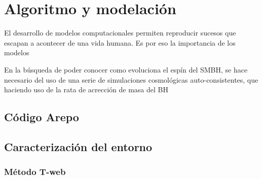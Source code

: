 \begin{savequote}[50mm]
\end{savequote}

\chapter{Algoritmo y modelación}
\label{cha:Modelo de Spin}
El desarrollo de modelos computacionales permiten reproducir sucesos que escapan a acontecer de una vida humana. Es por eso la importancia de los modelos

En la búsqueda de poder conocer como evoluciona el espín del SMBH, se hace necesario del uso de una serie de simulaciones cosmológicas auto-consistentes, que haciendo uso de la rata de acrección de masa del BH

\section{Código Arepo}
\label{sec: codigo arepo}


\section{Caracterización del entorno}
\label{sec: Caracterizacion entorno}

    \subsection{Método T-web}
    \label{subsec: Metodo_T-web}



